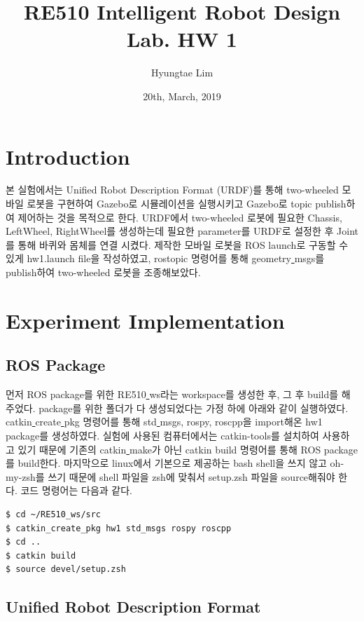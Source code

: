 \documentclass{article}
\title{RE510 Intelligent Robot Design Lab. HW 1}
\author{Hyungtae Lim}
\date{20th, March, 2019}
\begin{document}
\maketitle


\section{Introduction}

본 실험에서는 Unified Robot Description Format (URDF)를 통해  two-wheeled 모바일 로봇을 구현하여 Gazebo로 시뮬레이션을 실행시키고 Gazebo로 topic publish하여 제어하는 것을 목적으로 한다. URDF에서 two-wheeled 로봇에 필요한 Chassis,  LeftWheel, RightWheel를 생성하는데 필요한 parameter를 URDF로 설정한 후 Joint를 통해 바퀴와 몸체를 연결 시켰다. 제작한 모바일 로봇을 ROS launch로 구동할 수 있게 hw1.launch file을 작성하였고, rostopic 명령어를 통해 geometry\underline{ }msgs를 publish하여 two-wheeled 로봇을 조종해보았다.

\section{Experiment Implementation}

\subsection{ROS Package}

먼저 ROS package를 위한 RE510\underline{ }ws라는 workspace를 생성한 후, 그 후 build를 해주었다. package를 위한 폴더가 다 생성되었다는 가정 하에 아래와 같이 실행하였다. catkin\underline{ }create\underline{ }pkg 명령어를 통해 std\underline{ }msgs, rospy, roscpp을 import해온 hw1 package를 생성하였다. 실험에 사용된 컴퓨터에서는  catkin-tools를 설치하여 사용하고 있기 때문에 기존의 catkin\underline{ }make가 아닌 catkin build 명령어를 통해 ROS package를 build한다. 마지막으로 linux에서 기본으로 제공하는 bash shell을 쓰지 않고 oh-my-zsh를 쓰기 때문에 shell 파일을 zsh에 맞춰서 setup.zsh 파일을 source해줘야 한다. 코드 명령어는 다음과 같다. 

\begin{lstlisting}[frame=single]
$ cd ~/RE510_ws/src
$ catkin_create_pkg hw1 std_msgs rospy roscpp
$ cd ..
$ catkin build
$ source devel/setup.zsh

\end{lstlisting}

\subsection{Unified Robot Description Format}
\end{document}
